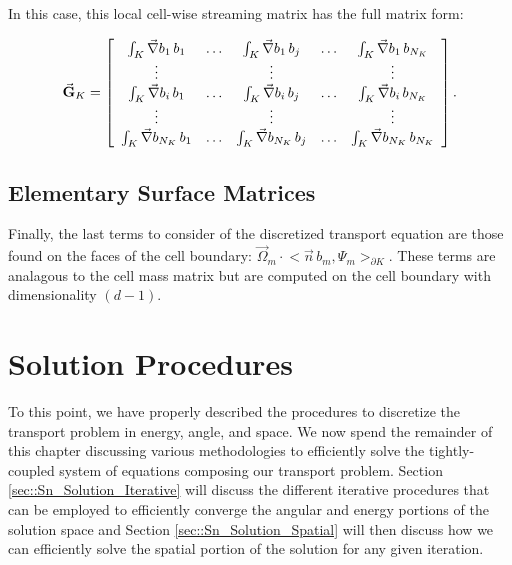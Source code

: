 \noindent In this case, this local cell-wise streaming matrix has the full matrix form:

\begin{equation}
\label{eq::Sn_streaming_matrix_array}
\vec{{\bf G}}_K =   \left[
\begin{array} {ccccc}
	\int_K \vec{\nabla}b_1 \, b_1  & \ldots & \int_K \vec{\nabla}b_1 \, b_j  & \ldots & \int_K \vec{\nabla}b_1 \, b_{N_K} \\
	\vdots  &  & \vdots  &  & \vdots \\
	\int_K \vec{\nabla} b_i \, b_1  & \ldots & \int_K \vec{\nabla}b_i \, b_j  & \ldots & \int_K \vec{\nabla}b_i \, b_{N_K} \\
	\vdots  &  & \vdots  &  & \vdots \\
	\int_K \vec{\nabla} b_{N_K} \, b_1  & \ldots & \int_K \vec{\nabla} b_{N_K} \, b_j  & \ldots & \int_K \vec{\nabla} b_{N_K} \, b_{N_K} \\
\end{array}
\right] .
\end{equation}

\subsection{Elementary Surface Matrices}
\label{sec::Sn_Spatial_Surface}

Finally, the last terms to consider of the discretized transport equation are those found on the faces of the cell boundary: $  \vec{\Omega}_m \cdot  \Big<  \vec{n} \, b_m, \Psi_m  \Big>_{\partial K}$. These terms are analagous to the cell mass matrix but are computed on the cell boundary with dimensionality $(d-1)$.

\section{Solution Procedures}
\label{sec::Sn_Solution}

To this point, we have properly described the procedures to discretize the transport problem in energy, angle, and space. We now spend the remainder of this chapter discussing various methodologies to efficiently solve the tightly-coupled system of equations composing our transport problem. Section \ref{sec::Sn_Solution_Iterative} will discuss the different iterative procedures that can be employed to efficiently converge the angular and energy portions of the solution space and Section \ref{sec::Sn_Solution_Spatial} will then discuss how we can efficiently solve the spatial portion of the solution for any given iteration.

